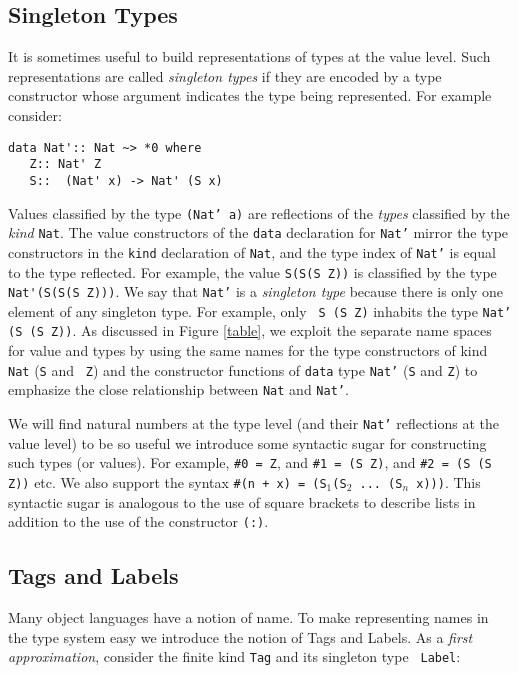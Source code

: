 \documentclass{sigplanconf}
\begin{document}
\subsection{Singleton Types}
It is sometimes useful to build representations of types at the value level.
Such representations are called {\em singleton types} if they are encoded
by a type constructor whose argument indicates the type being represented.
For example consider:
\begin{verbatim}
data Nat':: Nat ~> *0 where
   Z:: Nat' Z 
   S::  (Nat' x) -> Nat' (S x)
\end{verbatim}
\noindent
Values classified by the type {\tt (Nat' a)} are reflections of the {\em types}
classified by the {\em kind} {\tt Nat}. The value constructors of the {\tt data}
declaration for {\tt Nat'} mirror the type constructors in the {\tt kind}
declaration of {\tt Nat}, and the type index of {\tt Nat'} is equal to the
type reflected. For example, the value \verb+S(S(S Z))+ is classified by the
type \verb+Nat'(S(S(S Z)))+. We say that {\tt Nat'} is a {\em singleton type}
because there is only one element of any singleton type. For example, only {\tt
S (S Z)} inhabits the type {\tt Nat' (S (S Z))}. As discussed in Figure
\ref{table}, we exploit the separate name spaces for value and types by using
the same names for the type constructors of kind {\tt Nat} ({\tt S} and {\tt
Z}) and the constructor functions of {\tt data} type {\tt Nat'} ({\tt S} and
{\tt Z}) to emphasize the close relationship between {\tt Nat} and {\tt Nat'}.



We will find natural numbers at the type level (and their {\tt Nat'}
reflections at the value level) to be so useful we introduce some syntactic
sugar for constructing such types (or values). For example,
{\tt \#0 = Z}, and {\tt \#1 = (S Z)}, and {\tt \#2 = (S (S Z))} etc.
We also support the syntax {\tt \#(n + x) = (S$_1$(S$_2$ ... (S$_n$ x)))}.
This syntactic sugar is analogous to
the use of square brackets to describe lists in addition to the use
of the constructor \verb+(:)+.

\subsection{Tags and Labels}

Many object languages have a notion of name. To make representing names in the
type system easy we introduce the notion of Tags and Labels. As a {\em first
approximation}, consider the finite kind {\tt Tag} and its singleton type {\tt
Label}:
\end{document}
